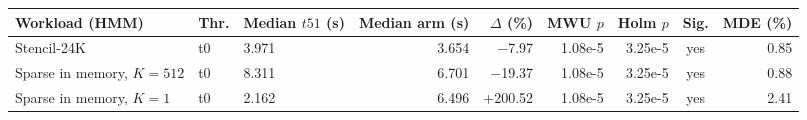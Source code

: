 \begin{tabular}{@{}lllrrrrcr@{}}
\toprule
Workload (HMM) & Thr. & Median $t51$ (s) & Median arm (s) & $\Delta$ (\%) & MWU $p$ & Holm $p$ & Sig. & MDE (\%) \\
\midrule
Stencil-24K & t0 & 3.971 & 3.654 & $-$7.97 & 1.08e-5 & 3.25e-5 & yes & 0.85 \\ %
Sparse in memory, $K=512$ & t0 & 8.311 & 6.701 & $-$19.37 & 1.08e-5 & 3.25e-5 & yes & 0.88 \\ %
Sparse in memory, $K=1$ & t0 & 2.162 & 6.496 & +200.52 & 1.08e-5 & 3.25e-5 & yes & 2.41 \\ %
\bottomrule
\end{tabular}
